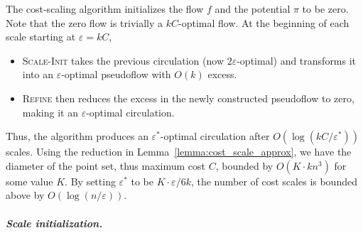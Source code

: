 \documentclass[a4paper,UKenglish]{socg-lipics-v2018}
\def\eps{\varepsilon}
\def\supp{\operatorname{supp}}
\theoremstyle{plain}
\numberwithin{figure}{section}
\renewcommand{\paragraph}{\subparagraph}
\begin{document}
%

The cost-scaling algorithm initializes the flow $f$ and the potential $\pi$ to be zero.
Note that the zero flow is trivially a $kC$-optimal flow.
At the beginning of each scale starting at $\eps = kC$,
\begin{itemize}
\item
\textsc{Scale-Init} takes the previous
circulation (now $2\eps$-optimal) and transforms it into an $\eps$-optimal
pseudoflow with $O(k)$ excess.
\item
\textsc{Refine} then reduces the excess in the newly constructed pseudoflow to zero, making it an $\eps$-optimal
circulation.
\end{itemize}
Thus, the algorithm produces an $\eps^*$-optimal circulation after
$O(\log(kC/\eps^*))$ scales.
%
Using the reduction in Lemma~\ref{lemma:cost_scale_approx}, we have the diameter of the point set, thus maximum cost $C$, bounded by $O(K \cdot kn^3)$ for some value $K$.  By setting $\eps^*$ to be $K \cdot \eps/6k$, the number of cost scales is bounded above by $O(\log(n/\eps))$.


\paragraph{Scale initialization.}

\end{document}
